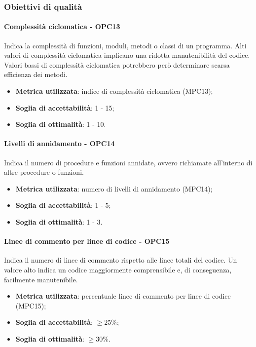 \documentclass[PianoDiQualifica.tex]{subfiles}
\begin{document}
		\subsubsection{Obiettivi di qualità}
			\paragraph{Complessità ciclomatica - OPC13}
				Indica la complessità di funzioni, moduli, metodi o classi di un programma. Alti valori di complessità
				ciclomatica implicano una ridotta manutenibilità del codice. Valori bassi di complessità ciclomatica potrebbero
				però determinare scarsa efficienza dei metodi.
				\begin{itemize}
					\item \textbf{Metrica utilizzata}: indice di complessità ciclomatica (MPC13);
					\item \textbf{Soglia di accettabilità}: 1 - 15;
					\item \textbf{Soglia di ottimalità}: 1 - 10.
				\end{itemize}
			
			\paragraph{Livelli di annidamento - OPC14}
				Indica il numero di procedure e funzioni annidate, ovvero richiamate all'interno di altre procedure o funzioni.
				\begin{itemize}
					\item \textbf{Metrica utilizzata}: numero di livelli di annidamento (MPC14);
					\item \textbf{Soglia di accettabilità}: 1 - 5;
					\item \textbf{Soglia di ottimalità}: 1 - 3.
				\end{itemize}
			
			\paragraph{Linee di commento per linee di codice - OPC15}
				Indica il numero di linee di commento rispetto alle linee totali del codice. Un valore alto indica un codice maggiormente comprensibile
				e, di conseguenza, facilmente manutenibile.
				\begin{itemize}
					\item \textbf{Metrica utilizzata}: percentuale linee di commento per linee di codice (MPC15);
					\item \textbf{Soglia di accettabilità}: \begin{math} \geq 25\% \end{math};
					\item \textbf{Soglia di ottimalità}: \begin{math} \geq 30\% \end{math}.
				\end{itemize}
			
\end{document}
